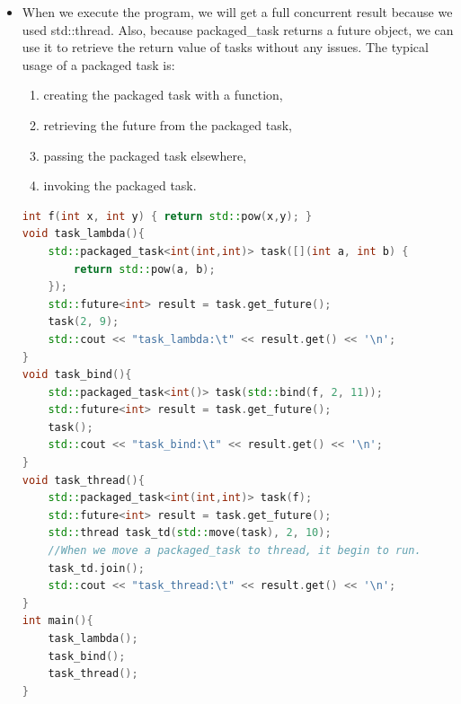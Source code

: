 \documentclass[a4paper,11pt,twoside]{book}
\begin{document}
\begin{itemize}
\begin{enumerate}
	\item Also, a \texttt{packaged\_task} needs to be invoked before you call future.get(), otherwise you program will freeze as the future will never become ready:
	
	\item A \texttt{packaged\_task} won't start on it's own, you have to invoke it. On the other hand, std::async with launch::async will try to run the task in a different thread. Use \texttt{std::async} if you want some things done and don't really care when they're done, and \texttt{std::packaged\_task} if you want to wrap up things in order to move them to other threads or call them later.
	
\end{enumerate}

    \item When we execute the program, we will get a full concurrent result because we used std::thread. Also, because packaged\_task returns a future object, we can use it to retrieve the return value of tasks without any issues. The typical usage of a packaged task is:

\begin{enumerate}
	\item creating the packaged task with a function,
	\item retrieving the future from the packaged task,
	\item passing the packaged task elsewhere,
	\item invoking the packaged task.
\end{enumerate}

\begin{lstlisting}[frame=single, language=c++]
int f(int x, int y) { return std::pow(x,y); }
void task_lambda(){
	std::packaged_task<int(int,int)> task([](int a, int b) {
		return std::pow(a, b); 
	});
	std::future<int> result = task.get_future();
	task(2, 9);
	std::cout << "task_lambda:\t" << result.get() << '\n';
}
void task_bind(){
	std::packaged_task<int()> task(std::bind(f, 2, 11));
	std::future<int> result = task.get_future();
	task();
	std::cout << "task_bind:\t" << result.get() << '\n';
}
void task_thread(){
	std::packaged_task<int(int,int)> task(f);
	std::future<int> result = task.get_future();
	std::thread task_td(std::move(task), 2, 10);
    //When we move a packaged_task to thread, it begin to run.
	task_td.join();
	std::cout << "task_thread:\t" << result.get() << '\n';
}
int main(){
	task_lambda();
	task_bind();
	task_thread();
}
\end{lstlisting}


\end{itemize}
\end{document}
